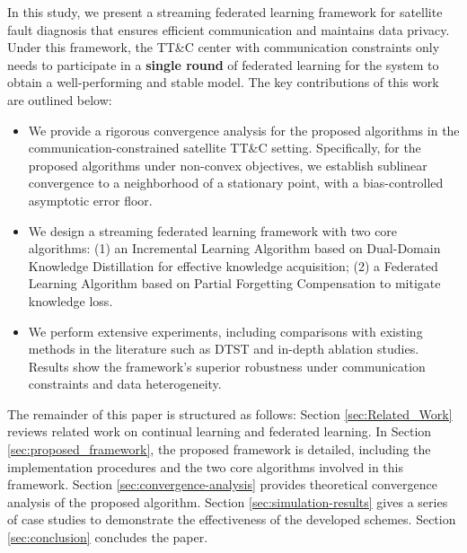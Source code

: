 In this study, we present a streaming federated learning framework for satellite fault diagnosis 
that ensures efficient communication and maintains data privacy. 
Under this framework, the TT\&C center with communication constraints only needs to 
participate in a \textbf{single round} of federated learning for the system to obtain a well-performing and stable model. 
The key contributions of this work are outlined below:
\begin{itemize}
  \item 
  We provide a rigorous convergence analysis for the proposed algorithms in the communication-constrained satellite TT\&C setting. 
  Specifically, for the proposed algorithms under non-convex objectives, 
  we establish sublinear convergence to a neighborhood of a stationary point, 
  with a bias-controlled asymptotic error floor.
  \item 
  We design a streaming federated learning framework with two core algorithms: 
  (1) an Incremental Learning Algorithm based on Dual-Domain Knowledge Distillation for effective knowledge acquisition; 
  (2) a Federated Learning Algorithm based on Partial Forgetting Compensation to mitigate knowledge loss.
  \item 
  We perform extensive experiments, including comparisons with existing methods in the literature such as DTST and in-depth ablation studies. 
  Results show the framework's superior robustness under communication constraints and data heterogeneity.
\end{itemize}

The remainder of this paper is structured as follows: 
Section \ref{sec:Related_Work} reviews related work on continual learning and federated learning. 
In Section \ref{sec:proposed_framework}, the proposed framework is detailed,
including the implementation procedures and the two core algorithms involved in this framework. 
Section \ref{sec:convergence-analysis} provides theoretical convergence analysis of the proposed algorithm.
Section \ref{sec:simulation-results} gives a series of case studies to demonstrate the effectiveness of the developed schemes. 
Section \ref{sec:conclusion} concludes the paper.